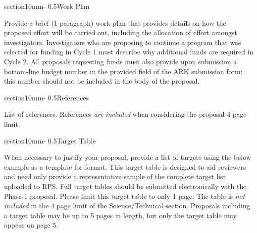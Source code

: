 \documentclass[letterpaper,11pt]{article}
\makeatletter
\renewcommand{\section}{\@startsection%
{section}{1}{0mm}{-\baselineskip}%
{0.5\baselineskip}{\normalfont\Large\bfseries}}%
\makeatother
\begin{document}
\section{Work Plan}

Provide a brief (1 paragraph) work plan that provides details on how the proposed effort will be carried out, including the allocation of effort amongst investigators. Investigators who are proposing to continue a program that was selected for funding in Cycle 1 must describe why additional funds are required in Cycle 2. All proposals requesting funds must also provide upon submission a bottom-line budget number in the provided field of the ARK submission form; this number should not be included in the body of the proposal.

\section{References}

List of references. References {\it are included} when considering the proposal 4 page limit.


\section{Target Table}

When necessary to justify your proposal, provide a list of targets using the below example as 
a template for format. This target table is designed to aid reviewers and need only provide a 
representative sample of the complete target list uploaded to RPS. Full target tables should be 
submitted electronically with the Phase-1 proposal. Please limit this target table to only 1 page. 
The table is {\it not included} in the 4 page limit of the Science/Technical section. Proposals including 
a target table may be up to 5 pages in length, but only the target table may appear on page 5.
\end{document}
